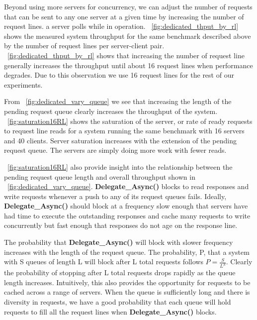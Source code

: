 \documentclass{uicthesi}
\begin{document}
Beyond using more servers for concurrency, we can adjust the number of requests that can be sent to any one server at a given time by increasing the number of request lines. a server polls while in operation. ~\ref{fig:dedicated_thput_by_rl} shows the measured system throughput for the same benchmark described above by the number of request lines per server-client pair. ~\ref{fig:dedicated_thput_by_rl} shows that increasing the number of request line generally increases the throughput until about 16 request lines when performance degrades. Due to this observation we use 16 request lines for the rest of our experiments. 

From ~\ref{fig:dedicated_vary_queue} we see that increasing the length of the pending request queue clearly increases the throughput of the system. ~\ref{fig:saturation16RL} shows the saturation of the server, or rate of ready requests to request line reads for a system running the same benchmark with 16 servers and 40 clients. Server saturation increases with the extension of the pending request queue. The servers are simply doing more work with fewer reads. 

~\ref{fig:saturation16RL} also provide insight into the relationship between the pending request queue length and overall throughput shown in ~\ref{fig:dedicated_vary_queue}. \textbf{Delegate\_Async()} blocks to read responses and write requests whenever a push to any of its request queues fails. Ideally, \textbf{Delegate\_Async()} should block at a frequency slow enough that servers have had time to execute the outstanding responses and cache many requests to write concurrently but fast enough that responses do not age on the response line. 

The probability that \textbf{Delegate\_Async()} will block with slower frequency increases with the length of the request queue. The probability, P, that a system with S queues of length L will block after L total requests follows $ P = \frac{S}{L^{S}} $. Clearly the probability of stopping after L total requests drops rapidly as the queue length increases. Intuitively, this also provides the opportunity for requests to be cached across a range of servers. When the queue is sufficiently long and there is diversity in requests, we have a good probability that each queue will hold requests to fill all the request lines when \textbf{Delegate\_Async()} blocks. 
\end{document}
